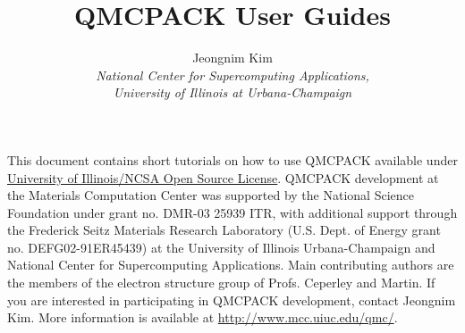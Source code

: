 \documentclass[11pt]{article}
\title{QMCPACK User Guides}
\author{Jeongnim Kim\\
\it National Center for Supercomputing Applications,\\
\it University of Illinois at Urbana-Champaign}
\begin{document}
\maketitle

This document contains short tutorials on how to use QMCPACK available under
\href{http://www.opensource.org/licenses/UoI-NCSA.php}{University of
Illinois/\-NCSA Open Source License}.  QMCPACK development at the Materials
Computation Center was supported by the National Science Foundation under grant
no. DMR-{}03 25939 ITR, with additional support through the Frederick Seitz
Materials Research Laboratory (U.S. Dept. of Energy grant no.
DEFG02-{}91ER45439) at the University of Illinois Urbana-{}Champaign and
National Center for Supercomputing Applications.  Main contributing authors are
the members of the electron structure group of Profs. Ceperley and Martin.  If
you are interested in participating in QMCPACK development, contact Jeongnim
Kim.  More information is available at \url{http://www.mcc.uiuc.edu/qmc/}.  

\tableofcontents
\newpage



%
\end{document}
